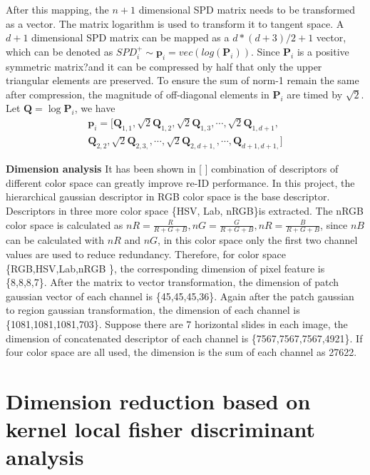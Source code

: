 \documentclass[conference,compsoc]{IEEEtran}
\begin{document}
After this mapping, the $n+1$ dimensional SPD matrix needs to be transformed as a vector. The matrix logarithm is used to transform it to tangent space. A $d+1$ dimensional SPD matrix can be mapped as a $d*(d+3)/2+1$ vector, which can be denoted as $SPD_i^+ \sim \bm{p}_i = vec(log(\bm{P}_i))$. Since $\bm{P}_i$ is a positive symmetric matrix?and it can be compressed by half that only the upper triangular 
elements are preserved. To ensure the sum of norm-1 remain the same after compression, the magnitude of off-diagonal elements in $\bm{P}_i$ are timed by $\sqrt2$.  Let $\bm{Q}=\log{\bm{P}_i}$, we have
\begin{equation}
\begin{aligned}
 \bm{p}_i = [\bm{Q}_{1,1},\sqrt2\bm{Q}_{1,2},\sqrt2\bm{Q}_{1,3},\cdots,\sqrt2\bm{Q}_{1,d+1},\\ 
 \bm{Q}_{2,2},\sqrt2\bm{Q}_{2,3,},\cdots,\sqrt2\bm{Q}_{2,d+1,},\cdots,\bm{Q}_{d+1,d+1,}]
\end{aligned}
\end{equation}

\textbf{Dimension analysis} It has been shown in [ ]  combination of descriptors of different color space can greatly improve re-ID performance. In this project, the hierarchical gaussian descriptor in RGB color space is the base descriptor. Descriptors in three more color space \{HSV, Lab, nRGB\}is extracted. The nRGB color space is calculated as $nR = \frac{R}{R+G+B},nG = \frac{G}{R+G+B},nR = \frac{B}{R+G+B}$, since $nB$ can be calculated with $nR$ and $nG$, in this color space only the first two channel values are used to reduce redundancy. Therefore, for color space \{RGB,HSV,Lab,nRGB \}, the corresponding dimension of pixel feature is \{8,8,8,7\}. After the matrix to vector transformation, the dimension of patch gaussian vector of each channel is \{45,45,45,36\}. Again after the patch gaussian to region gaussian transformation, the dimension of each channel is \{1081,1081,1081,703\}. Suppose there are 7 horizontal slides in each image, the dimension of concatenated descriptor of each channel is \{7567,7567,7567,4921\}. If four color space are all used, the dimension is the sum of each channel as 27622. 


\section{Dimension reduction based on kernel local fisher discriminant analysis }
\end{document}
